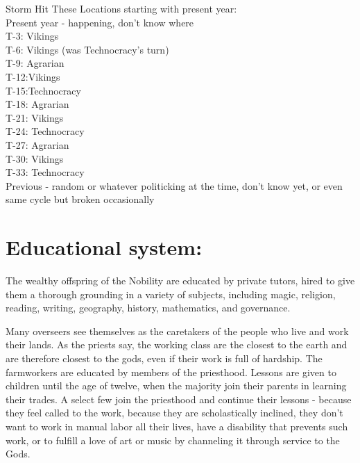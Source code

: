 \documentclass[blue]{GL2020}
\begin{document}

Storm Hit These Locations starting with present year:\\
Present year - happening, don’t know where\\
T-3: Vikings\\
T-6: Vikings (was Technocracy’s turn)\\
T-9: Agrarian\\
T-12:Vikings\\
T-15:Technocracy\\
T-18: Agrarian\\
T-21: Vikings\\
T-24: Technocracy\\
T-27: Agrarian\\
T-30: Vikings\\
T-33: Technocracy\\
Previous - random or whatever politicking at the time, don’t know yet, or even same cycle but broken occasionally\\

\section*{Educational system:}

The wealthy offspring of the Nobility are educated by private tutors, hired to give them a thorough grounding in a variety of subjects, including magic, religion, reading, writing, geography, history, mathematics, and governance.  %

Many overseers see themselves as the caretakers of the people who live and work their lands.  As the priests say, the working class are the closest to the earth and are therefore closest to the gods, even if their work is full of hardship.  The farmworkers are educated by members of the priesthood.  Lessons are given to children until the age of twelve, when the majority join their parents in learning their trades.  A select few join the priesthood and continue their lessons - because they feel called to the work, because they are scholastically inclined, they don't want to work in manual labor all their lives, have a disability that prevents such work, or to fulfill a love of art or music by channeling it through service to the Gods.
\end{document}
